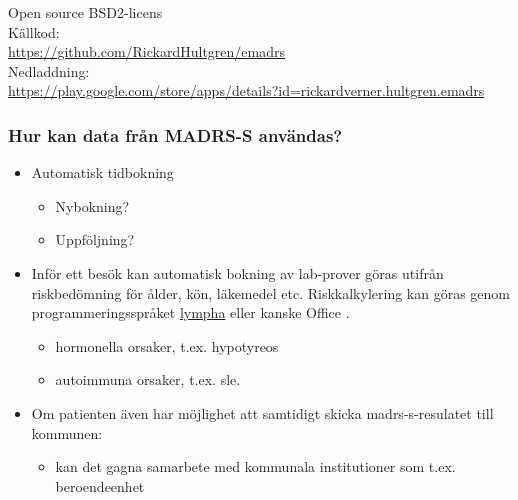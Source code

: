 \documentclass[english]{beamer}
\begin{document}
\begin{frame}
Open source BSD2-licens\\
Källkod:\\
\href{https://github.com/RickardHultgren/emadrs}{\url{https://github.com/RickardHultgren/emadrs}}\\
Nedladdning:\\
\href{https://play.google.com/store/apps/details?id=rickardverner.hultgren.emadrs}{\url{https://play.google.com/store/apps/details?id=rickardverner.hultgren.emadrs}}
\end{frame}

\begin{frame}
\frametitle{Hur kan data från MADRS-S användas?}
	\begin{itemize}
	\item  {Automatisk tidbokning}\\
		\begin{itemize}
		\item  {Nybokning?}
		\item  {Uppföljning?}
		\end{itemize}
	\item  {Inför ett besök kan automatisk bokning av lab-prover göras utifrån riskbedömning för ålder, kön, läkemedel etc. Riskkalkylering kan göras genom programmeringsspråket {\textcolor{blue}{\href{https://github.com/RickardHultgren/lympha}{{\sc lympha}}}} eller kanske Office {}}.\vspace{-1em}
		\begin{itemize}
		\item  {hormonella orsaker, t.ex. hypotyreos}
		\item  {autoimmuna orsaker, t.ex. {\sc sle}}.
		\end{itemize}
	\item  {Om patienten även har möjlighet att samtidigt skicka {\sc madrs-s}-resulatet till kommunen:}\\
		\begin{itemize}
		\item kan det gagna samarbete med kommunala institutioner som t.ex. beroendeenhet
		\end{itemize}
	\end{itemize}
	\pause	
{\textcolor{lila}{\\\ \\}}

\end{frame}
\end{document}
